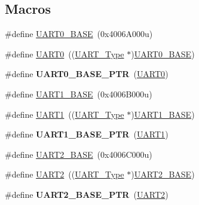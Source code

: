 \subsection*{Macros}
\begin{DoxyCompactItemize}
\item 
\#define \hyperlink{group__UART__Peripheral__Access__Layer_ga7a07348b4332ff6b88abf6092347deba}{U\+A\+R\+T0\+\_\+\+B\+A\+SE}~(0x4006\+A000u)
\item 
\#define \hyperlink{group__UART__Peripheral__Access__Layer_ga0508661f121639ffdee7de2353a0def2}{U\+A\+R\+T0}~((\hyperlink{structUART__Type}{U\+A\+R\+T\+\_\+\+Type} $\ast$)\hyperlink{group__UART__Peripheral__Access__Layer_ga7a07348b4332ff6b88abf6092347deba}{U\+A\+R\+T0\+\_\+\+B\+A\+SE})
\item 
\#define {\bfseries U\+A\+R\+T0\+\_\+\+B\+A\+S\+E\+\_\+\+P\+TR}~(\hyperlink{group__UART__Peripheral__Access__Layer_ga0508661f121639ffdee7de2353a0def2}{U\+A\+R\+T0})\hypertarget{group__UART__Peripheral__Access__Layer_ga50a02c91ffbd11fa7b4f0c33fe585199}{}\label{group__UART__Peripheral__Access__Layer_ga50a02c91ffbd11fa7b4f0c33fe585199}

\item 
\#define \hyperlink{group__UART__Peripheral__Access__Layer_ga383bf0c4670c3a7fa72df80f66331a46}{U\+A\+R\+T1\+\_\+\+B\+A\+SE}~(0x4006\+B000u)
\item 
\#define \hyperlink{group__UART__Peripheral__Access__Layer_ga8d69bf04d07af4fbbab5a8bd291f65ff}{U\+A\+R\+T1}~((\hyperlink{structUART__Type}{U\+A\+R\+T\+\_\+\+Type} $\ast$)\hyperlink{group__UART__Peripheral__Access__Layer_ga383bf0c4670c3a7fa72df80f66331a46}{U\+A\+R\+T1\+\_\+\+B\+A\+SE})
\item 
\#define {\bfseries U\+A\+R\+T1\+\_\+\+B\+A\+S\+E\+\_\+\+P\+TR}~(\hyperlink{group__UART__Peripheral__Access__Layer_ga8d69bf04d07af4fbbab5a8bd291f65ff}{U\+A\+R\+T1})\hypertarget{group__UART__Peripheral__Access__Layer_gafb5b1236c1cdf2d9a6464251b791030c}{}\label{group__UART__Peripheral__Access__Layer_gafb5b1236c1cdf2d9a6464251b791030c}

\item 
\#define \hyperlink{group__UART__Peripheral__Access__Layer_gac9998d643534960b684d45a60b998421}{U\+A\+R\+T2\+\_\+\+B\+A\+SE}~(0x4006\+C000u)
\item 
\#define \hyperlink{group__UART__Peripheral__Access__Layer_ga7f6bd6eb89ae2eeae97af4207ebe3cde}{U\+A\+R\+T2}~((\hyperlink{structUART__Type}{U\+A\+R\+T\+\_\+\+Type} $\ast$)\hyperlink{group__UART__Peripheral__Access__Layer_gac9998d643534960b684d45a60b998421}{U\+A\+R\+T2\+\_\+\+B\+A\+SE})
\item 
\#define {\bfseries U\+A\+R\+T2\+\_\+\+B\+A\+S\+E\+\_\+\+P\+TR}~(\hyperlink{group__UART__Peripheral__Access__Layer_ga7f6bd6eb89ae2eeae97af4207ebe3cde}{U\+A\+R\+T2})\hypertarget{group__UART__Peripheral__Access__Layer_ga75ca2ea4e490b3c1c7aa55fc9c25cd37}{}\label{group__UART__Peripheral__Access__Layer_ga75ca2ea4e490b3c1c7aa55fc9c25cd37}


\end{DoxyCompactItemize}
